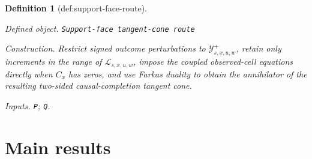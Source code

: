\documentclass{article}
\newtheorem{definition}{Definition}
\begin{document}
\begin{definition}[def:support-face-route]\label{def:support-face-route}
\par\smallskip\noindent\emph{Defined object.} \texttt{Support-\allowbreak{}face tangent-\allowbreak{}cone route}
\par\smallskip\noindent\emph{Construction.} Restrict signed outcome perturbations to \(\mathcal Y^+_{s,x,u,w}\), retain only increments in the range of \(\mathscr L_{s,x,u,w}\), impose the coupled observed-cell equations directly when \(C_x\) has zeros, and use Farkas duality to obtain the annihilator of the resulting two-sided causal-completion tangent cone.
\par\smallskip\noindent\emph{Inputs.} \texttt{P}; \texttt{Q}.
\end{definition}

\section{Main results}
\end{document}
